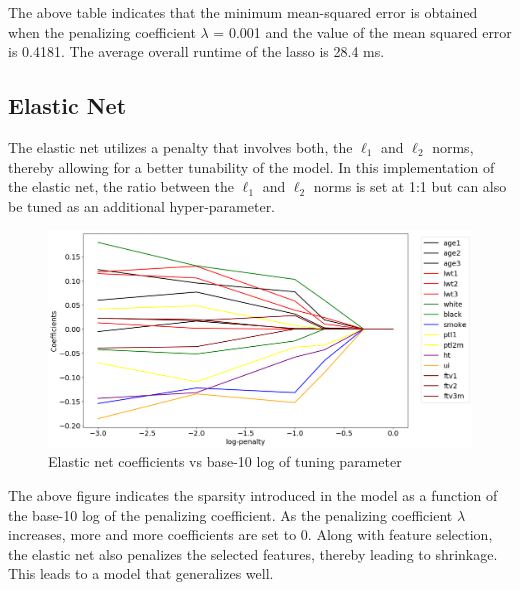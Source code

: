 \documentclass[a4paper,12pt]{article}
\begin{document}
\noindent The above table indicates that the minimum mean-squared error is obtained when the penalizing coefficient $\lambda$ = 0.001 and the value of the mean squared error is 0.4181. The average overall runtime of the lasso is 28.4 ms.
		\newpage
    	\subsection{Elastic Net}
    	The elastic net utilizes a penalty that involves both, the $\ell_1$ and $\ell_2$ norms, thereby allowing for a better tunability of the model. In this implementation of the elastic net, the ratio between the $\ell_1$ and $\ell_2$ norms is set at 1:1 but can also be tuned as an additional hyper-parameter.
    	\begin{figure}[H]
            \centering
            \includegraphics[scale=0.4]{enet-path.png}
            \caption{Elastic net coefficients vs base-10 log of tuning parameter}
            \label{fig:neurons}
        \end{figure}
        \noindent The above figure indicates the sparsity introduced in the model as a function of the base-10 log of the penalizing coefficient. As the penalizing coefficient $\lambda$ increases, more and more coefficients are set to 0. Along with feature selection, the elastic net also penalizes the selected features, thereby leading to shrinkage. This leads to a model that generalizes well.  \\ 
        
\end{document}
